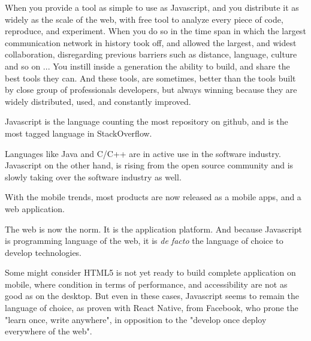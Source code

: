 When you provide a tool as simple to use as Javascript, and you distribute it as widely as the scale of the web, with free tool to analyze every piece of code, reproduce, and experiment.
When you do so in the time span in which the largest communication network in history took off, and allowed the largest, and widest collaboration, disregarding previous barriers such as distance, language, culture and so on ...
You instill inside a generation the ability to build, and share the best tools they can.
And these tools, are sometimes, better than the tools built by close group of professionals developers, but always winning because they are widely distributed, used, and constantly improved.




Javascript is the language counting the most repository on github, and is the most tagged language in StackOverflow.

Languages like Java and C/C++ are in active use in the software industry.
Javascript on the other hand, is rising from the open source community and is slowly taking over the software industry as well.

With the mobile trends, most products are now released as a mobile apps, and a web application.

The web is now the norm.
It is the application platform.
And because Javascript is programming language of the web, it is \textit{de facto} the language of choice to develop technologies.

Some might consider HTML5 is not yet ready to build complete application on mobile, where condition in terms of performance, and accessibility are not as good as on the desktop.
But even in these cases, Javascript seems to remain the language of choice, as proven with React Native, from Facebook, who prone the "learn once, write anywhere", in opposition to the "develop once deploy everywhere of the web".



